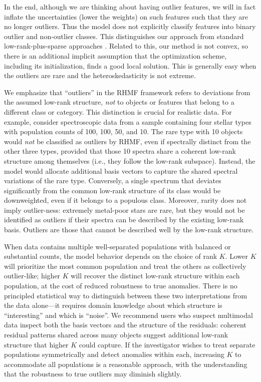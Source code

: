 \documentclass[onecolumn,floatfix,linenumbers,trackchanges]{aastex631}
\begin{document}
In the end, although we are thinking about having outlier features, we will in fact inflate the uncertainties (lower the weights) on such features such that they are no longer outliers.
Thus the model does not explicitly classify features into binary outlier and non-outlier classes.
This distinguishes our approach from standard low-rank-plus-sparse approaches \citep{candes2011}.
Related to this, our method is not convex, so there is an additional implicit assumption that the optimization scheme, including its initialization, finds a good local solution.
This is generally easy when the outliers are rare and the heteroskedasticity is not extreme.

We emphasize that ``outliers'' in the RHMF framework refers to deviations from the assumed low-rank structure, \emph{not} to objects or features that belong to a different class or category. This distinction is crucial for realistic data. For example, consider spectroscopic data from a sample containing four stellar types with population counts of 100, 100, 50, and 10. The rare type with 10 objects would \emph{not} be classified as outliers by RHMF, even if spectrally distinct from the other three types, provided that those 10 spectra share a coherent low-rank structure among themselves (i.e., they follow the low-rank subspace). Instead, the model would allocate additional basis vectors to capture the shared spectral variations of the rare type. Conversely, a single spectrum that deviates significantly from the common low-rank structure of its class would be downweighted, even if it belongs to a populous class. Moreover, rarity does not imply outlier-ness: extremely metal-poor stars are rare, but they would not be identified as outliers if their spectra can be described by the existing low-rank basis. Outliers are those that cannot be described well by the low-rank structure.

When data contains multiple well-separated populations with balanced or substantial counts, the model behavior depends on the choice of rank $K$. Lower $K$ will prioritize the most common population and treat the others as collectively outlier-like; higher $K$ will recover the distinct low-rank structure within each population, at the cost of reduced robustness to true anomalies. There is no principled statistical way to distinguish between these two interpretations from the data alone---it requires domain knowledge about which structure is ``interesting'' and which is ``noise''. We recommend users who suspect multimodal data inspect both the basis vectors and the structure of the residuals: coherent residual patterns shared across many objects suggest additional low-rank structure that higher $K$ could capture. If the investigator wishes to treat separate populations symmetrically and detect anomalies within each, increasing $K$ to accommodate all populations is a reasonable approach, with the understanding that the robustness to true outliers may diminish slightly.
\end{document}
